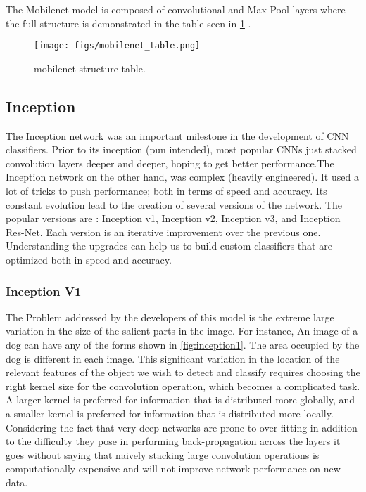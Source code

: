 The Mobilenet model is composed of convolutional and Max Pool layers where the full structure is demonstrated in the table seen in \cref{fig:mobilenet_table} \cite{b11}.

\begin{figure}[!htpb]
	\centering
	\texttt{[image: figs/mobilenet\_table.png]}
	\caption{mobilenet structure table.}\label{fig:mobilenet_table}
\end{figure}

\subsection{Inception}

The Inception network was an important milestone in the development of CNN classifiers. Prior to its inception (pun intended), most popular CNNs just stacked convolution layers deeper and deeper, hoping to get better performance.The Inception network on the other hand, was complex (heavily engineered). It used a lot of tricks to push performance; both in terms of speed and accuracy. Its constant evolution lead to the creation of several versions of the network. The popular versions are : Inception v1, Inception v2, Inception v3, and Inception Res-Net. Each version is an iterative improvement over the previous one. Understanding the upgrades can help us to build custom classifiers that are optimized both in speed and accuracy.

\subsubsection{Inception V1}
The Problem addressed by the developers of this model is the extreme large variation in the size of the salient parts in the image. For instance, An image of a dog can have any of the forms shown in \cref{fig:inception1}. The area occupied by the dog is different in each image. This significant variation in the location of the relevant features of the object we wish to detect and classify requires choosing the right kernel size for the convolution operation, which becomes a complicated task. A larger kernel is preferred for information that is distributed more globally, and a smaller kernel is preferred for information that is distributed more locally. Considering the fact that very deep networks are prone to over-fitting in addition to the difficulty they pose in performing back-propagation across the layers it goes without saying that naively stacking large convolution operations is computationally expensive and will not improve network performance on new data.

